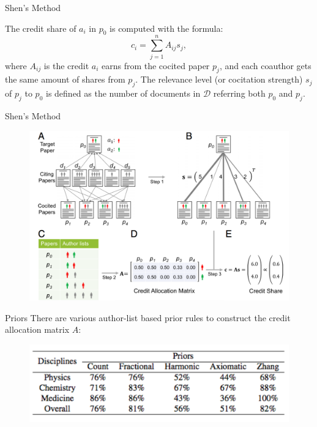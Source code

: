 \documentclass{beamer}
\begin{document}
\begin{frame}{Shen's Method}
\begin{block}{}
The credit share of $a_i$ in $p_0$ is computed with the formula: 
\[c_i = \sum_{j=1}^n A_{ij}s_j,\]
where $A_{ij}$ is the credit $a_i$ earns from the cocited paper $p_j$, and each coauthor gets the same amount of shares from $p_j$. The relevance level (or cocitation strength) $s_j$ of $p_j$ to $p_0$ is defined as the number of documents in $\mathcal D$ referring both $p_0$ and $p_j$.
\end{block}
\end{frame}

\begin{frame}{Shen's Method}
\begin{figure}[ht]
\centering
\includegraphics[scale=0.25]{figures/credalloc_algo}
\end{figure}
\end{frame}

\begin{frame}{Priors}
There are various author-list based prior rules to construct the credit allocation matrix $A$: 
\begin{figure}[ht]
\centering
\includegraphics[scale=0.3]{figures/comparison}
\end{figure}
\end{frame}
\end{document}
